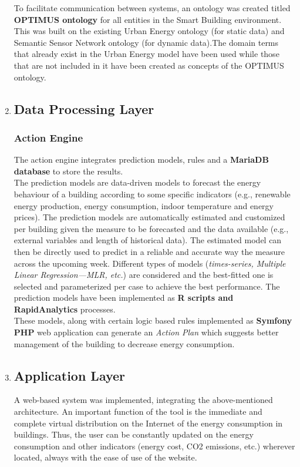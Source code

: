 \documentclass{report}
\begin{document}
\begin{enumerate}
    To facilitate communication between systems, an ontology was created titled \textbf{OPTIMUS ontology} for all entities in the Smart Building environment. This was built on the existing Urban Energy
    ontology (for static data) and Semantic Sensor Network ontology (for dynamic data).The domain terms that already exist in the Urban Energy model have been used while those that are not included in it have been created as concepts of the OPTIMUS ontology.\\

    \item\subsection*{Data Processing Layer}
    \subsubsection{Action Engine}
    The action engine integrates prediction models, rules and a \textbf{MariaDB database} to store the results.\\

    The prediction models are data-driven models to forecast the energy behaviour of a building
    according to some specific indicators (e.g., renewable energy production, energy consumption, indoor temperature and energy prices). The prediction models are automatically estimated and customized per building given the measure to be forecasted and the data available (e.g., external variables and length of historical data). The estimated model can then be directly used to predict in a reliable and accurate way the measure across the upcoming week. Different types of models (\textit{times-series, Multiple Linear Regression—MLR, etc.}) are considered and the best-fitted one is selected and parameterized per case to achieve the best performance. The prediction models have been implemented as \textbf{R scripts and RapidAnalytics} processes.\\
    
    These models, along with certain logic based rules implemented as  \textbf{Symfony PHP} web application can generate an \textit{Action Plan} which suggests better management of the building to decrease energy consumption. 

    \item\subsection*{Application Layer}
        A web-based system was implemented, integrating the above-mentioned architecture. An
    important function of the tool is the immediate and complete virtual distribution on the Internet
    of the energy consumption in buildings. Thus, the user can be constantly updated on the energy
    consumption and other indicators (energy cost, CO2 emissions, etc.) wherever located, always with
    the ease of use of the website.\\


\end{enumerate}
\end{document}
